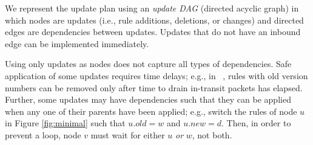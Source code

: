 We represent the update plan using an {\em update DAG} (directed acyclic graph) in which nodes are updates (i.e., rule additions, deletions, or changes) and directed edges are dependencies between updates. Updates that do not have an inbound edge can be implemented immediately.

Using only updates as nodes does not capture all types of dependencies. Safe application of some updates requires time delays; e.g., in ~\cite{safeupdate}, rules with old version numbers can be removed only after time to drain in-transit packets has elapsed. Further, some updates may have dependencies such that they can be applied when any one of their parents have been applied; e.g., switch the rules of node $u$ in Figure \ref{fig:minimal} such that $u.old = w$ and $u.new = d$. Then, in order to prevent a loop, node $v$ must wait  for either $u$ \emph{or} $w$, not both.

%


